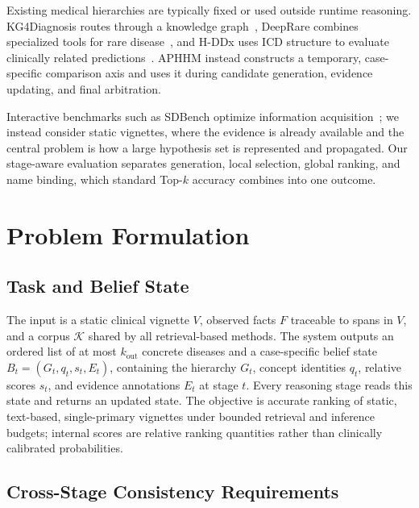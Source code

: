 \documentclass[letterpaper]{article} %
\begin{document}
Existing medical hierarchies are typically fixed or used outside runtime reasoning.
KG4Diagnosis routes through a knowledge graph~\cite{kg4diagnosis}, DeepRare combines specialized tools for rare disease~\cite{deeprare2025}, and H-DDx uses ICD structure to evaluate clinically related predictions~\cite{hddx2025}.
APHHM instead constructs a temporary, case-specific comparison axis and uses it during candidate generation, evidence updating, and final arbitration.

Interactive benchmarks such as SDBench optimize information acquisition~\cite{sdbench2025}; we instead consider static vignettes, where the evidence is already available and the central problem is how a large hypothesis set is represented and propagated.
Our stage-aware evaluation separates generation, local selection, global ranking, and name binding, which standard Top-$k$ accuracy combines into one outcome.

\section{Problem Formulation}
\label{sec:problem}

\subsection{Task and Belief State}
\label{sec:task}

The input is a static clinical vignette $V$, observed facts $F$ traceable to spans in $V$, and a corpus $\mathcal{K}$ shared by all retrieval-based methods.
The system outputs an ordered list of at most $k_{\mathrm{out}}$ concrete diseases and a case-specific belief state
$B_t=(G_t,q_t,s_t,E_t)$, containing the hierarchy $G_t$, concept identities $q_t$, relative scores $s_t$, and evidence annotations $E_t$ at stage $t$.
Every reasoning stage reads this state and returns an updated state.
The objective is accurate ranking of static, text-based, single-primary vignettes under bounded retrieval and inference budgets; internal scores are relative ranking quantities rather than clinically calibrated probabilities.

\subsection{Cross-Stage Consistency Requirements}
\label{sec:dilemma}
\end{document}
